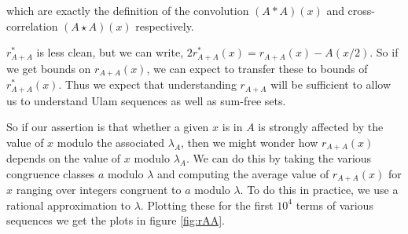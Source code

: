 \documentclass{report}
\theoremstyle{remark}
\numberwithin{equation}{section}
\begin{document}
which are exactly the definition of the convolution $(A \ast A)(x)$
and cross-correlation $(A \star A)(x)$ respectively.

$r^*_{A+A}$ is less clean, but we can write,
$2r^*_{A+A}(x) = r_{A+A}(x) - A(x/2)$.  So if we get bounds on
$r_{A+A}(x)$, we can expect to transfer these to bounds of
$r^*_{A+A}(x)$.  Thus we expect that understanding $r_{A+A}$ will be
sufficient to allow us to understand Ulam sequences as well as
sum-free sets.

So if our assertion is that whether a given $x$ is in $A$ is strongly
affected by the value of $x$ modulo the associated $\lambda_A$, then
we might wonder how $r_{A+A}(x)$ depends on the value of $x$ modulo
$\lambda_A$.  We can do this by taking the various congruence classes
$a$ modulo $\lambda$ and computing the average value of $r_{A+A}(x)$
for $x$ ranging over integers congruent to $a$ modulo $\lambda$.  To
do this in practice, we use a rational approximation to $\lambda$.
Plotting these for the first $10^4$ terms of various sequences we get
the plots in figure \ref{fig:rAA}.
\end{document}
